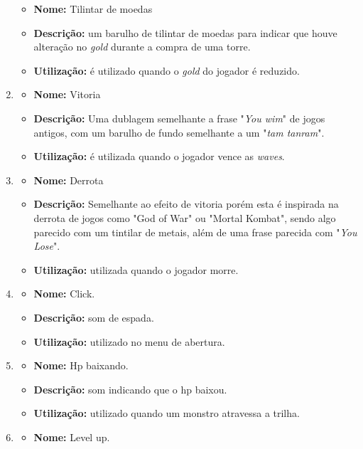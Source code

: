 \documentclass[11pt]{article} %
\begin{document}
\begin{enumerate}
\begin{itemize}
\item \textbf{Nome:} Tilintar de moedas
\item \textbf{Descrição:} um barulho de tilintar de moedas para indicar que houve alteração no \textit{gold} durante a compra de uma torre. 
\item \textbf{Utilização:} é utilizado quando o \textit{gold} do jogador é reduzido.
\end{itemize}
\item \begin{itemize}
\item \textbf{Nome:} Vitoria
\item \textbf{Descrição:} Uma dublagem semelhante a frase "\textit{You wim}" de jogos antigos, com um barulho de fundo semelhante a um "\textit{tam tanram}".
\item \textbf{Utilização:} é utilizada quando o jogador vence as \textit{waves}.
\end{itemize}
\item \begin{itemize}
\item \textbf{Nome:} Derrota
\item \textbf{Descrição:} Semelhante ao efeito de vitoria porém esta é inspirada na derrota de jogos como "God of War" ou "Mortal Kombat", sendo algo parecido com um tintilar de metais, além de uma frase parecida com "\textit{You Lose}".
\item \textbf{Utilização:} utilizada quando o jogador morre.
\end{itemize}
\item \begin{itemize}
\item \textbf{Nome:} Click.
\item \textbf{Descrição:} som de espada.
\item \textbf{Utilização:} utilizado no menu de abertura.
\end{itemize}
\item \begin{itemize}
\item \textbf{Nome:} Hp baixando.
\item \textbf{Descrição:} som indicando que o hp baixou.
\item \textbf{Utilização:} utilizado quando um monstro atravessa a trilha.
\end{itemize}
\item \begin{itemize}
\item \textbf{Nome:} Level up.

\end{itemize}
\end{enumerate}
\end{document}
